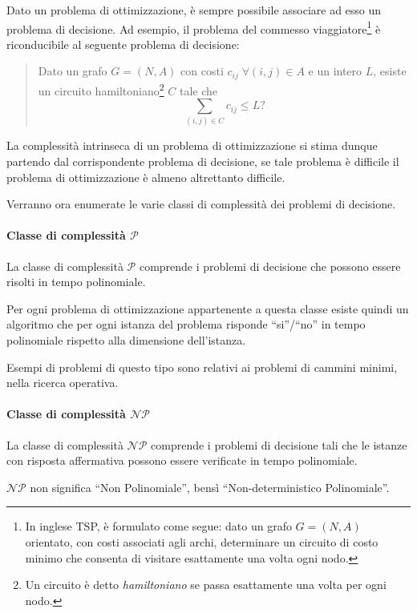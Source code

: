 Dato un problema di ottimizzazione, è sempre possibile associare ad esso un problema di 
decisione. Ad esempio, il problema del commesso viaggiatore\footnote{In inglese \ac{TSP}, 
è formulato come segue: dato un grafo $G = (N, A)$ orientato, con costi associati agli 
archi, determinare un circuito di costo minimo che consenta di visitare esattamente una 
volta ogni nodo.} è riconducibile al seguente problema di decisione:
\begin{quotation}
Dato un grafo $G = (N, A)$ con costi $c_{ij} \; \forall (i,j) \in A$ e 
un intero $L$, esiste un circuito hamiltoniano\footnote{Un circuito è detto 
\emph{hamiltoniano} se passa esattamente una volta per ogni nodo.} $C$ tale che
\begin{displaymath}
 \sum_{(i,j) \in C}c_{ij} \leq L\text{?}
\end{displaymath}
\end{quotation}
La complessità intrinseca di un problema di ottimizzazione si stima dunque partendo dal 
corrispondente problema di decisione, se tale problema è difficile il problema di 
ottimizzazione è almeno altrettanto difficile.

Verranno ora enumerate le varie classi di complessità dei problemi di decisione.

\paragraph{Classe di complessità $\mathcal{P}$}
\begin{mydef}
La classe di complessità $\mathcal{P}$ comprende i problemi di decisione che possono 
essere risolti in tempo polinomiale.
\end{mydef}
Per ogni problema di ottimizzazione appartenente a questa classe esiste quindi un 
algoritmo che per ogni istanza del problema risponde ``si''/``no'' in tempo polinomiale 
rispetto alla dimensione dell'istanza.

Esempi di problemi di questo tipo sono relativi ai problemi di cammini minimi, nella 
ricerca operativa.

\paragraph{Classe di complessità $\mathcal{NP}$}
\begin{mydef}
 La classe di complessità $\mathcal{NP}$ comprende i problemi di decisione 
tali che le istanze con risposta affermativa possono essere verificate in tempo 
polinomiale.
\end{mydef}
$\mathcal{NP}$ non significa ``Non Polinomiale'', bensì ``Non-deterministico 
Polinomiale''.

